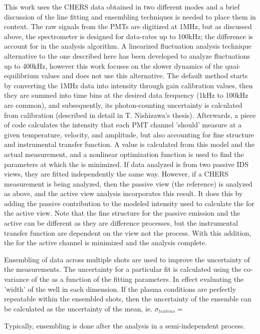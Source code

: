 This work uses the CHERS data obtained in two different modes and a brief discussion of the line fitting and ensembling techniques is needed to place them in context. The raw signals from the PMTs are digitized at 1MHz, but as discussed above, the spectrometer is designed for data-rates up to 100kHz; the difference is account for in the analysis algorithm. A linearized fluctuation analysis technique alternative to the one described here has been developed to analyze fluctuations up to 400kHz\cite{Nishizawa2017}, however this work focuses on the slower dynamics of the quai-equilibrium values and does not use this alternative. The default method starts by converting the 1MHz data into intensity through gain calibration values, then they are summed into time bins at the desired data frequency (1kHz to 100kHz are common), and subsequently, its photon-counting uncertainty is calculated from calibration (described in detail in T. Nishizawa's thesis\cite{Nishizawa2018}). Afterwards, a piece of code calculates the intensity that each PMT channel 'should' measure at a given temperature, velocity, and amplitude, but also accounting for fine structure and instrumental transfer function. A \chisq value is calculated from this model and the actual measurement, and a nonlinear optimization function is used to find the parameters at which the \chisq is minimized. If data analyzed is from two passive IDS views, they are fitted independently the same way. However, if a CHERS measurement is being analyzed, then the passive view (the reference) is analyzed as above, and the active view analysis incorporates this result. It does this by adding the passive contribution to the modeled intensity used to calculate the \chisq for the active view. Note that the fine structure for the passive emission and the active can be different as they are difference processes, but the instrumental transfer function are dependent on the view not the process. With this addition, the \chisq for the active channel is minimized and the analysis complete.

Ensembling of data across multiple shots are used to improve the uncertainty of the measurements. The uncertainty for a particular fit is calculated using the co-variance of the \chisq as a function of the fitting parameters. In effect evaluating the 'width' of the \chisq well in each dimension. If the plasma conditions are perfectly repeatable within the ensembled shots, then the uncertainty of the ensemble can be calculated as the uncertainty of the mean, ie. $\sigma_{text{ens}} = \frac{}{}$

Typically, ensembling is done after the analysis in a semi-independent process. 


